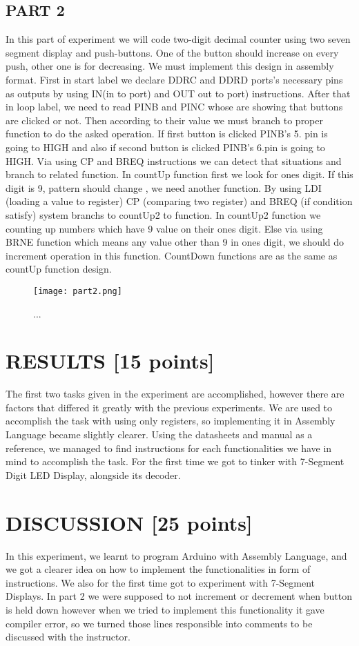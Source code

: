 \documentclass[pdftex,12pt,a4paper]{article}
\begin{document}
\subsection{PART 2}
In this part of experiment we will code two-digit decimal counter using two seven segment display and push-buttons. One of the button should increase on every push, other one is for decreasing. We must implement this design in assembly format. First in start label we declare DDRC and DDRD ports's necessary pins as outputs by using IN(in to port) and OUT out to port) instructions. After that in loop label, we need to read PINB and PINC whose are showing that buttons are clicked or not. Then according to their value we must branch to proper function to do the asked operation. If first button is clicked PINB's 5. pin is going to HIGH and also if second button is clicked PINB's 6.pin is going to HIGH. Via using CP and BREQ instructions we can detect that situations and branch to related function. In countUp function first we look for ones digit. If this digit is 9, pattern should change , we need another function. By using LDI (loading a value to register) CP (comparing two register) and BREQ (if condition satisfy) system branchs to countUp2 to function. In countUp2 function we counting up numbers which have 9 value on their ones digit. Else via using BRNE function which means any value other than 9 in ones digit, we should do increment operation in this function. CountDown functions are as the same as countUp function design.

\begin{figure}[H]
	\centering
	\texttt{[image: part2.png]}	
	\caption{...}
	\label{fig3}
\end{figure}






\section{RESULTS [15 points]}
The first two tasks given in the experiment are accomplished, however there are factors that differed it greatly with the previous experiments. We are used to accomplish the task with using only registers, so implementing it in Assembly Language became slightly clearer. Using the datasheets and manual as a reference, we managed to find instructions for each functionalities we have in mind to accomplish the task. For the first time we got to tinker with 7-Segment Digit LED Display, alongside its decoder.
\section{DISCUSSION [25 points]}
In this experiment, we learnt to program Arduino with Assembly Language, and we got a clearer idea on how to implement the functionalities in form of instructions. We also for the first time got to experiment with 7-Segment Displays. In part 2 we were supposed to not increment or decrement when button is held down however when we tried to implement this functionality it gave compiler error, so we turned those lines responsible into comments to be discussed with the instructor.
\end{document}
